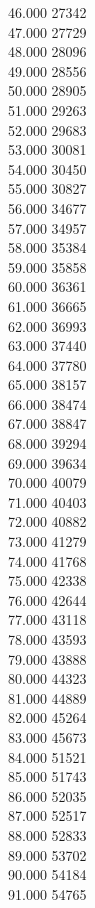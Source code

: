 { 46.000	27342 \\
 47.000	27729 \\
 48.000	28096 \\
 49.000	28556 \\
 50.000	28905 \\
 51.000	29263 \\
 52.000	29683 \\
 53.000	30081 \\
 54.000	30450 \\
 55.000	30827 \\
 56.000	34677 \\
 57.000	34957 \\
 58.000	35384 \\
 59.000	35858 \\
 60.000	36361 \\
 61.000	36665 \\
 62.000	36993 \\
 63.000	37440 \\
 64.000	37780 \\
 65.000	38157 \\
 66.000	38474 \\
 67.000	38847 \\
 68.000	39294 \\
 69.000	39634 \\
 70.000	40079 \\
 71.000	40403 \\
 72.000	40882 \\
 73.000	41279 \\
 74.000	41768 \\
 75.000	42338 \\
 76.000	42644 \\
 77.000	43118 \\
 78.000	43593 \\
 79.000	43888 \\
 80.000	44323 \\
 81.000	44889 \\
 82.000	45264 \\
 83.000	45673 \\
 84.000	51521 \\
 85.000	51743 \\
 86.000	52035 \\
 87.000	52517 \\
 88.000	52833 \\
 89.000	53702 \\
 90.000	54184 \\
 91.000	54765 \\
}
